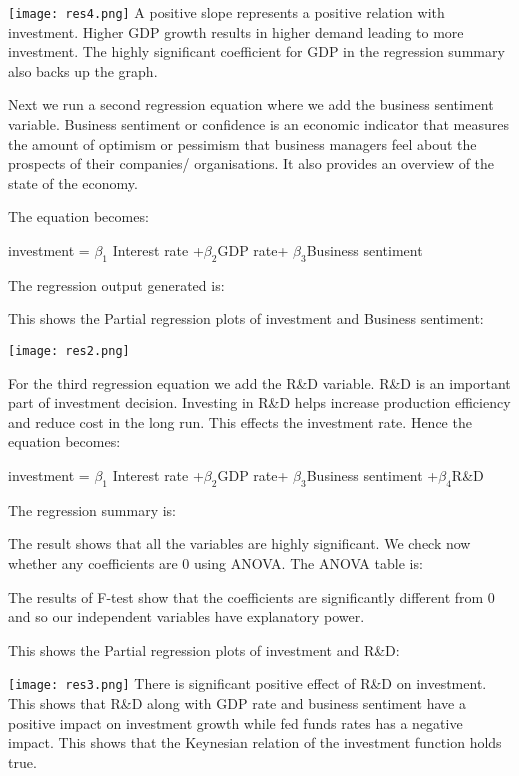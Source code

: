 \documentclass[12pt,a4paper,leqno]{report}
\theoremstyle{definition}
\begin{document}
\texttt{[image: res4.png]} 
A positive slope represents a positive relation with investment. Higher GDP growth results in higher demand leading to more investment. The highly significant coefficient for GDP in the regression summary also backs up the graph.  

Next we run a second regression equation where we add the business sentiment variable. Business sentiment or confidence is an economic indicator that measures the amount of optimism or pessimism that business managers feel about the prospects of their companies/ organisations. It also provides an overview of the state of the economy. 

The equation becomes: 
\begin{center}
investment = $\beta_{1}$ Interest rate +$\beta_{2}$GDP rate+ $\beta_{3}$Business sentiment
\end{center}
\newpage
The regression output generated is:


This shows the Partial regression plots of investment and Business sentiment:

\texttt{[image: res2.png]}

\newpage
For the third regression equation we add the R\&D variable. R\&D is an important part of investment decision. Investing in R\&D helps increase production efficiency and reduce cost in the long run. This effects the investment rate. Hence the equation becomes:
\begin{center}
	investment = $\beta_{1}$ Interest rate +$\beta_{2}$GDP rate+ $\beta_{3}$Business sentiment +$\beta_{4}$R\&D
\end{center}
The regression summary is:

The result shows that all the variables are highly significant. We check now whether any coefficients are 0 using ANOVA. The ANOVA table is:\newline



The results of F-test show that the coefficients are significantly different from 0 and so our independent variables have explanatory power.  
\newpage

This shows the Partial regression plots of investment and R\&D:

\texttt{[image: res3.png]}
There is significant positive effect of R\&D on investment. This shows that R\&D along with GDP rate and business sentiment have a positive impact on investment growth while fed funds rates has a negative impact. This shows that the Keynesian relation of the investment function holds true. 
\end{document}
